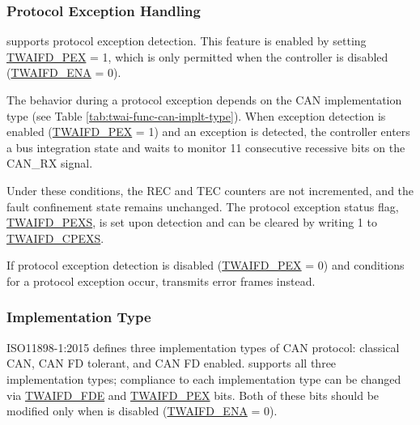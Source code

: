 \documentclass[main\_\_EN.tex]{subfiles}
\begin{document}
\subsubsection{Protocol Exception Handling}

\modulename{} supports protocol exception detection. This feature is enabled by setting \hyperref[fielddesc:TWAIFDPEX]{TWAIFD\_PEX} = 1, which is only permitted when the controller is disabled (\hyperref[fielddesc:TWAIFDENA]{TWAIFD\_ENA} = 0).

The behavior during a protocol exception depends on the CAN implementation type (see Table \ref{tab:twai-func-can-implt-type}). When exception detection is enabled (\hyperref[fielddesc:TWAIFDPEX]{TWAIFD\_PEX} = 1) and an exception is detected, the controller enters a bus integration state and waits to monitor 11 consecutive recessive bits on the CAN\_RX signal.

Under these conditions, the REC and TEC counters are not incremented, and the fault confinement state remains unchanged. The protocol exception status flag, \hyperref[fielddesc:TWAIFDPEXS]{TWAIFD\_PEXS}, is set upon detection and can be cleared by writing 1 to \hyperref[fielddesc:TWAIFDCPEXS]{TWAIFD\_CPEXS}.

If protocol exception detection is disabled (\hyperref[fielddesc:TWAIFDPEX]{TWAIFD\_PEX} = 0) and conditions for a protocol exception occur, \modulename{} transmits error frames instead.

\subsubsection{Implementation Type}

ISO11898-1:2015 defines three implementation types of CAN protocol: classical CAN, CAN FD tolerant, and CAN FD enabled. \modulename{} supports all three implementation types; compliance to each implementation type can be changed via \hyperref[fielddesc:TWAIFDFDE]{TWAIFD\_FDE} and \hyperref[fielddesc:TWAIFDPEX]{TWAIFD\_PEX} bits. Both of these bits should be modified only when \modulename{} is disabled (\hyperref[fielddesc:TWAIFDENA]{TWAIFD\_ENA} = 0).
\end{document}
